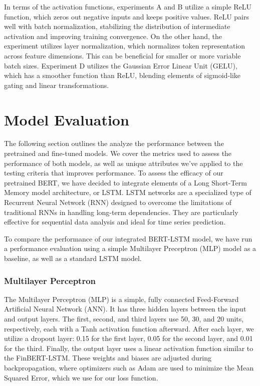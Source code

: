 \documentclass[12pt]{article}
\begin{document}
In terms of the activation functions, experiments A and B utilize a simple ReLU function, which zeros out negative inputs and keeps positive values. ReLU pairs well with batch normalization, stabilizing the distribution of intermediate activation and improving training convergence. On the other hand, the experiment utilizes layer normalization, which normalizes token representation across feature dimensions. This can be beneficial for smaller or more variable batch sizes. Experiment D utilizes the Gaussian Error Linear Unit (GELU), which has a smoother function than ReLU, blending elements of sigmoid-like gating and linear transformations.

\section*{Model Evaluation}

The following section outlines the analyze the performance between the pretrained and fine-tuned models. We cover the metrics used to assess the performance of both models, as well as unique attributes we've applied to the testing criteria that improves performance. To assess the efficacy of our pretrained BERT, we have decided to integrate elements of a Long Short-Term Memory model architecture, or LSTM. LSTM networks are a specialized type of Recurrent Neural Network (RNN) designed to overcome the limitations of traditional RNNs in handling long-term dependencies. They are particularly effective for sequential data analysis and ideal for time series prediction.

To compare the performance of our integrated BERT-LSTM model, we have run a performance evaluation using a simple Multilayer Preceptron (MLP) model as a baseline, as well as a standard LSTM model. 


\subsubsection*{Multilayer Perceptron}

The Multilayer Perceptron (MLP) is a simple, fully connected Feed-Forward Artificial Neural Network (ANN). It has three hidden layers between the input and output layers. The first, second, and third layers use 50, 30, and 20 units, respectively, each with a Tanh activation function afterward. After each layer, we utilize a dropout layer: 0.15 for the first layer, 0.05 for the second layer, and 0.01 for the third. Finally, the output layer uses a linear activation function similar to the FinBERT-LSTM. These weights and biases are adjusted during backpropagation, where optimizers such as Adam are used to minimize the Mean Squared Error, which we use for our loss function.
\end{document}
